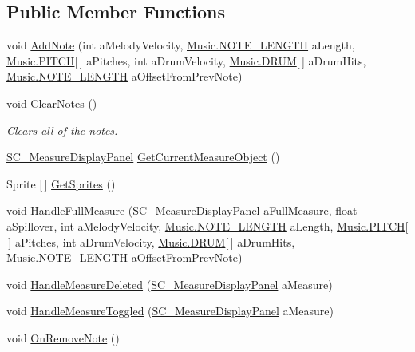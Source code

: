 \subsection*{Public Member Functions}
\begin{DoxyCompactItemize}
\item 
void \hyperlink{class_note_display_container_aa108ddf1c59c22600eb47b6ccc831573}{Add\+Note} (int a\+Melody\+Velocity, \hyperlink{group___music_enums_gaf11b5f079adbb21c800b9eca1c5c3cbd}{Music.\+N\+O\+T\+E\+\_\+\+L\+E\+N\+G\+TH} a\+Length, \hyperlink{group___music_enums_ga508f69b199ea518f935486c990edac1d}{Music.\+P\+I\+T\+CH}\mbox{[}$\,$\mbox{]} a\+Pitches, int a\+Drum\+Velocity, \hyperlink{group___music_enums_gade475b4382c7066d1af13e7c13c029b6}{Music.\+D\+R\+UM}\mbox{[}$\,$\mbox{]} a\+Drum\+Hits, \hyperlink{group___music_enums_gaf11b5f079adbb21c800b9eca1c5c3cbd}{Music.\+N\+O\+T\+E\+\_\+\+L\+E\+N\+G\+TH} a\+Offset\+From\+Prev\+Note)
\item 
void \hyperlink{class_note_display_container_abcbda84772a6e66780b0f21928edf853}{Clear\+Notes} ()
\begin{DoxyCompactList}\small\item\em Clears all of the notes. \end{DoxyCompactList}\item 
\hyperlink{class_s_c___measure_display_panel}{S\+C\+\_\+\+Measure\+Display\+Panel} \hyperlink{class_note_display_container_aa61de8a22ca340125208074a49c67478}{Get\+Current\+Measure\+Object} ()
\item 
Sprite \mbox{[}$\,$\mbox{]} \hyperlink{class_note_display_container_a71bea931f237005ffb04e33baef71bef}{Get\+Sprites} ()
\item 
void \hyperlink{class_note_display_container_a4d29c459fb7475f9daa86322307c3cd2}{Handle\+Full\+Measure} (\hyperlink{class_s_c___measure_display_panel}{S\+C\+\_\+\+Measure\+Display\+Panel} a\+Full\+Measure, float a\+Spillover, int a\+Melody\+Velocity, \hyperlink{group___music_enums_gaf11b5f079adbb21c800b9eca1c5c3cbd}{Music.\+N\+O\+T\+E\+\_\+\+L\+E\+N\+G\+TH} a\+Length, \hyperlink{group___music_enums_ga508f69b199ea518f935486c990edac1d}{Music.\+P\+I\+T\+CH}\mbox{[}$\,$\mbox{]} a\+Pitches, int a\+Drum\+Velocity, \hyperlink{group___music_enums_gade475b4382c7066d1af13e7c13c029b6}{Music.\+D\+R\+UM}\mbox{[}$\,$\mbox{]} a\+Drum\+Hits, \hyperlink{group___music_enums_gaf11b5f079adbb21c800b9eca1c5c3cbd}{Music.\+N\+O\+T\+E\+\_\+\+L\+E\+N\+G\+TH} a\+Offset\+From\+Prev\+Note)
\item 
void \hyperlink{class_note_display_container_a77cacb7c234490ae5ddb1f3979ecf9bc}{Handle\+Measure\+Deleted} (\hyperlink{class_s_c___measure_display_panel}{S\+C\+\_\+\+Measure\+Display\+Panel} a\+Measure)
\item 
void \hyperlink{class_note_display_container_a54dc5bb2f6850037473ec82efe632716}{Handle\+Measure\+Toggled} (\hyperlink{class_s_c___measure_display_panel}{S\+C\+\_\+\+Measure\+Display\+Panel} a\+Measure)
\item 
void \hyperlink{class_note_display_container_a400c6151d074c2cb1f116ff589ce13b8}{On\+Remove\+Note} ()
\end{DoxyCompactItemize}
